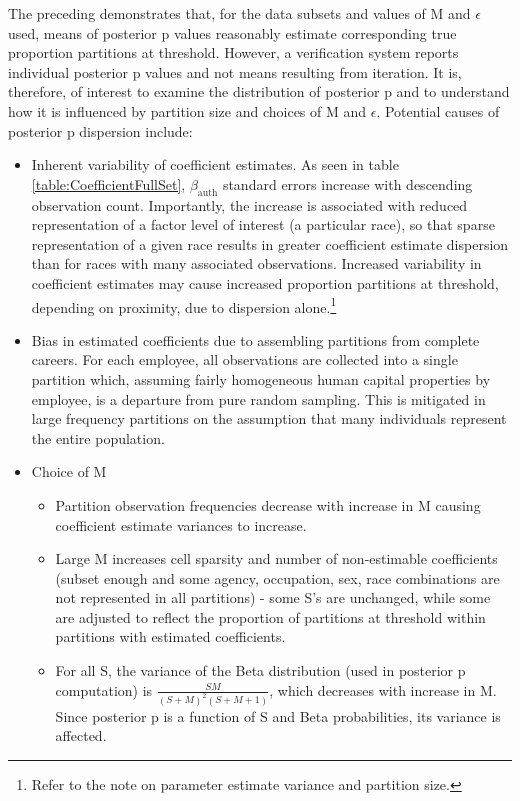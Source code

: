 \documentclass[10pt, letterpaper]{article}
\begin{document}
\begin{spacing}{1.0}
\clearpage

The preceding demonstrates that, for the data subsets and values of M and $\epsilon$ used, means of posterior p values reasonably estimate corresponding true proportion partitions at threshold.  However, a verification system reports individual posterior p values and not means resulting from iteration.  It is, therefore, of interest to examine the distribution of posterior p and to understand how it is influenced by partition size and choices of M and $\epsilon$.  Potential causes of posterior p dispersion include:

\begin{itemize}
    
    \item Inherent variability of coefficient estimates.  As seen in table \ref{table:CoefficientFullSet}, $\beta_\text{auth}$ standard errors increase with descending observation count.  Importantly, the increase is associated with reduced representation of a factor level of interest (a particular race), so that sparse representation of a given race results in greater coefficient estimate dispersion than for races with many associated observations.  Increased variability in coefficient estimates may cause increased proportion partitions at threshold, depending on proximity, due to dispersion alone.\footnote{\label{fn:EstVar}Refer to the note on parameter estimate variance and partition size.}
    
    \item Bias in estimated coefficients due to assembling partitions from complete careers.  For each employee, all observations are collected into a single partition which, assuming fairly homogeneous human capital properties by employee, is a departure from pure random sampling.  This is mitigated in large frequency partitions on the assumption that many individuals represent the entire population.
    
    \item Choice of M
    \begin{itemize}
        \item Partition observation frequencies decrease with increase in M causing coefficient estimate variances to increase.\footnotemark[\ref{fn:EstVar}]
        \item Large M increases cell sparsity and number of non-estimable coefficients (subset enough and some agency, occupation, sex, race combinations are not represented in all partitions) - some S's are unchanged, while some are adjusted to reflect the proportion of partitions at threshold within partitions with estimated coefficients.
        \item For all S, the variance of the Beta distribution (used in posterior p computation) is  $\frac{SM}{(S+M)^2(S+M+1)}$, which decreases with increase in M.  Since posterior p is a function of S and Beta probabilities, its variance is affected.
    \end{itemize}


\end{itemize}
\end{spacing}
\end{document}
